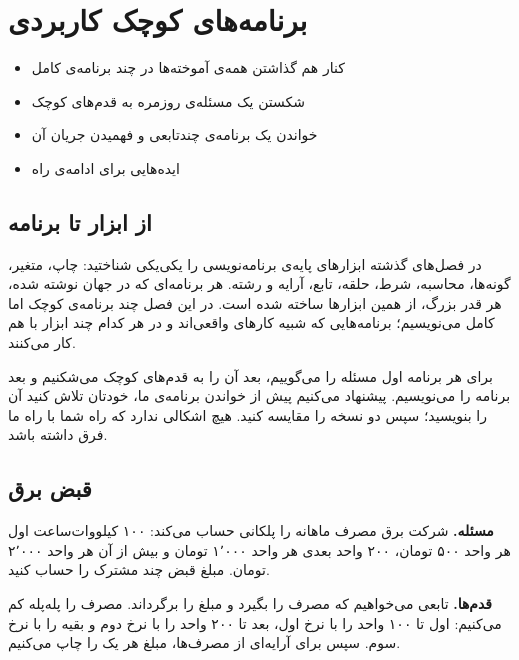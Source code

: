 \chapter{برنامه‌های کوچک کاربردی}\label{ch:projects}

\begin{goals}
\begin{itemize}
  \item کنار هم گذاشتن همه‌ی آموخته‌ها در چند برنامه‌ی کامل
  \item شکستن یک مسئله‌ی روزمره به قدم‌های کوچک
  \item خواندن یک برنامه‌ی چندتابعی و فهمیدن جریان آن
  \item ایده‌هایی برای ادامه‌ی راه
\end{itemize}
\end{goals}

\section{از ابزار تا برنامه}

در فصل‌های گذشته ابزارهای پایه‌ی برنامه‌نویسی را یکی‌یکی شناختید: چاپ،
متغیر، گونه‌ها، محاسبه، شرط، حلقه، تابع، آرایه و رشته. هر برنامه‌ای که در
جهان نوشته شده، هر قدر بزرگ، از همین ابزارها ساخته شده است. در این فصل
چند برنامه‌ی کوچک اما کامل می‌نویسیم؛ برنامه‌هایی که شبیه کارهای واقعی‌اند
و در هر کدام چند ابزار با هم کار می‌کنند.

برای هر برنامه اول مسئله را می‌گوییم، بعد آن را به قدم‌های کوچک می‌شکنیم و
بعد برنامه را می‌نویسیم. پیشنهاد می‌کنیم پیش از خواندن برنامه‌ی ما، خودتان
تلاش کنید آن را بنویسید؛ سپس دو نسخه را مقایسه کنید. هیچ اشکالی ندارد که
راه شما با راه ما فرق داشته باشد.

\section{قبض برق}

\textbf{مسئله.} شرکت برق مصرف ماهانه را پلکانی حساب می‌کند: ۱۰۰ کیلووات‌ساعت
اول هر واحد ۵۰۰ تومان، ۲۰۰ واحد بعدی هر واحد ۱٬۰۰۰ تومان و بیش از آن هر واحد
۲٬۰۰۰ تومان. مبلغ قبض چند مشترک را حساب کنید.

\textbf{قدم‌ها.} تابعی می‌خواهیم که مصرف را بگیرد و مبلغ را برگرداند. مصرف
را پله‌پله کم می‌کنیم: اول تا ۱۰۰ واحد را با نرخ اول، بعد تا ۲۰۰ واحد را با
نرخ دوم و بقیه را با نرخ سوم. سپس برای آرایه‌ای از مصرف‌ها، مبلغ هر یک را
چاپ می‌کنیم.

